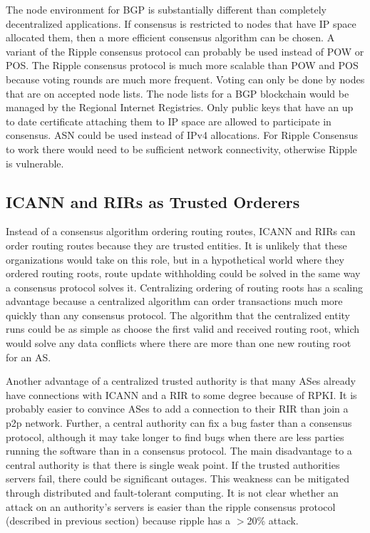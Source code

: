 \documentclass[letterpaper, 10 pt, conference]{ieeeconf}  %
\begin{document}
The node environment for BGP is substantially different than completely decentralized applications. If consensus is restricted to nodes that have IP space allocated them, then a more efficient consensus algorithm can be chosen. A variant of the Ripple consensus protocol can probably be used instead of POW or POS. The Ripple consensus protocol is much more scalable than POW and POS because voting rounds are much more frequent. Voting can only be done by nodes that are on accepted node lists. The node lists for a BGP blockchain would be managed by the Regional Internet Registries. Only public keys that have an up to date certificate attaching them to IP space are allowed to participate in consensus. ASN could be used instead of IPv4 allocations. For Ripple Consensus to work there would need to be sufficient network connectivity, otherwise Ripple is vulnerable.

\subsection{ICANN and RIRs as Trusted Orderers}

Instead of a consensus algorithm ordering routing routes, ICANN and RIRs can order routing routes because they are trusted entities. It is unlikely that these organizations would take on this role, but in a hypothetical world where they ordered routing roots, route update withholding could be solved in the same way a consensus protocol solves it. Centralizing ordering of routing roots has a scaling advantage because a centralized algorithm can order transactions much more quickly than any consensus protocol. The algorithm that the centralized entity runs could be as simple as choose the first valid and received routing root, which would solve any data conflicts where there are more than one new routing root for an AS. 

Another advantage of a centralized trusted authority is that many ASes already have connections with ICANN and a RIR to some degree because of RPKI. It is probably easier to convince ASes to add a connection to their RIR than join a p2p network. Further, a central authority can fix a bug faster than a consensus protocol, although it may take longer to find bugs when there are less parties running the software than in a consensus protocol. The main disadvantage to a central authority is that there is single weak point. If the trusted authorities servers fail, there could be significant outages. This weakness can be mitigated through distributed and fault-tolerant computing. It is not clear whether an attack on an authority's servers is easier than the ripple consensus protocol (described in previous section) because ripple has a $>$20\% attack.
\end{document}
